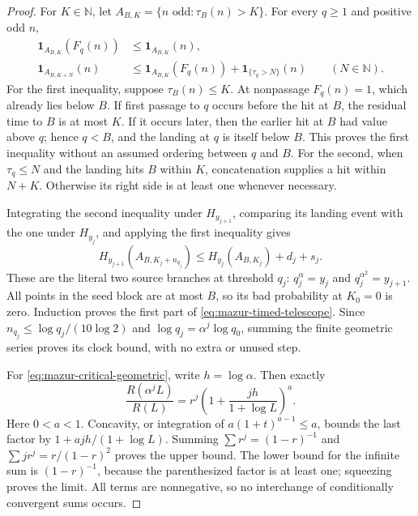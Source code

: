 \documentclass[11pt]{article}
\theoremstyle{remark}\newtheorem{remark}[proposition]{Remark}
\begin{document}
\begin{proof}
For \(K\in\mathbb N\), let \(A_{B,K}=\{n\text{ odd}:\tau_B(n)>K\}\).
For every \(q\ge1\) and positive odd \(n\),
\begin{align}
 \mathbf1_{A_{B,K}}(F_q(n))&\le\mathbf1_{A_{B,K}}(n),\nonumber\\
 \mathbf1_{A_{B,K+N}}(n)&\le
 \mathbf1_{A_{B,K}}(F_q(n))+\mathbf1_{\{\tau_q>N\}}(n)
 \qquad(N\in\mathbb N).
 \label{eq:mazur-timed-pointwise}
\end{align}
For the first inequality, suppose \(\tau_B(n)\le K\). At nonpassage
\(F_q(n)=1\), which already lies below \(B\).
If first passage to \(q\) occurs before the hit at \(B\), the residual
time to \(B\) is at most \(K\). If it occurs later, then the earlier
hit at \(B\) had value above \(q\); hence \(q<B\), and the landing
at \(q\) is itself below \(B\). This proves the first inequality
without an assumed ordering between \(q\) and \(B\).
For the second, when \(\tau_q\le N\) and the landing hits \(B\)
within \(K\), concatenation supplies a hit within \(N+K\).
Otherwise its right side is at least one whenever necessary.

Integrating the second inequality under \(H_{y_{j+1}}\),
comparing its landing event with the one under \(H_{y_j}\),
and applying the first inequality gives
\[
 H_{y_{j+1}}(A_{B,K_j+n_{q_j}})
 \le H_{y_j}(A_{B,K_j})+d_j+s_j.
\]
These are the literal two source branches at threshold \(q_j\):
\(q_j^\alpha=y_j\) and \(q_j^{\alpha^2}=y_{j+1}\).
All points in the seed block are at most \(B\), so its bad
probability at \(K_0=0\) is zero. Induction proves the first
part of \eqref{eq:mazur-timed-telescope}.
Since \(n_{q_j}\le\log q_j/(10\log2)\) and
\(\log q_j=\alpha^j\log q_0\), summing the finite geometric
series proves its clock bound, with no extra or unused step.

For \eqref{eq:mazur-critical-geometric}, write \(h=\log\alpha\).
Then exactly
\[
 \frac{R(\alpha^jL)}{R(L)}
 =r^j\left(1+\frac{jh}{1+\log L}\right)^a.
\]
Here \(0<a<1\). Concavity, or integration of
\(a(1+t)^{a-1}\le a\), bounds the last factor by
\(1+ajh/(1+\log L)\). Summing
\(\sum r^j=(1-r)^{-1}\) and
\(\sum jr^j=r/(1-r)^2\) proves the upper bound.
The lower bound for the infinite sum is \((1-r)^{-1}\),
because the parenthesized factor is at least one; squeezing
proves the limit. All terms are nonnegative, so no interchange
of conditionally convergent sums occurs.


\end{proof}
\end{document}
